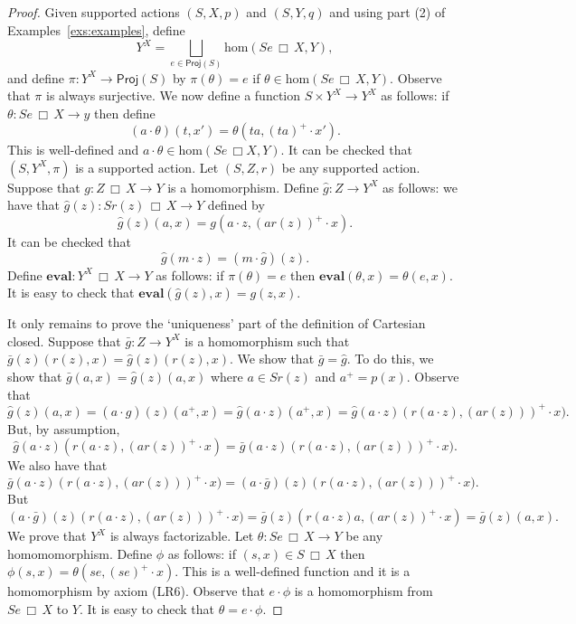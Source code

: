 \documentclass[a4paper]{amsart}
\begin{document}
\begin{proof}
Given supported actions $(S,X,p)$ and $(S,Y,q)$ and using part (2) of Examples~\ref{exs:examples},
define
$$Y^{X} = \bigsqcup_{e \in \mathsf{Proj}(S)} \mbox{hom}(Se \, \Box \, X, Y),$$ 
and define $\pi \colon Y^{X} \rightarrow \mathsf{Proj}(S)$ by $\pi (\theta) = e$ if $\theta \in \mbox{hom}(Se \, \Box \, X,Y)$.
Observe that $\pi$ is always surjective.
We now define a function $S \times Y^{X} \rightarrow Y^{X}$ as follows: 
if $\theta \colon Se\, \Box \,X \rightarrow y$ then define
$$(a \cdot \theta)(t,x') = \theta (ta, (ta)^{+} \cdot x').$$
This is well-defined and $a \cdot \theta \in \mbox{hom}(Se\, \Box X,Y)$.
It can be checked that $(S,Y^{X},\pi)$ is a supported action.
Let $(S,Z,r)$  be any supported action.
Suppose that $g \colon Z\, \Box \, X \rightarrow Y$ is a homomorphism.
Define $\hat{g} \colon Z \rightarrow Y^{X}$ as follows:
we have that $\hat{g}(z) \colon Sr(z) \, \Box \, X \rightarrow Y$ defined by
$$\hat{g}(z)(a,x) = g(a \cdot z, (ar(z))^{+} \cdot x).$$
It can be checked that
$$\hat{g}(m \cdot z) = (m \cdot \hat{g})(z).$$
Define $\mathbf{eval} \colon Y^{X} \, \Box \, X \rightarrow Y$ as follows:
if $\pi (\theta) = e$ 
then $\mathbf{eval}(\theta, x) = \theta (e,x)$.
It is easy to check that $\mathbf{eval}(\hat{g}(z),x) = g(z,x)$.

It only remains to prove the `uniqueness' part of the definition of Cartesian closed.
Suppose that $\bar{g} \colon Z \rightarrow Y^{X}$ is a homomorphism
such that $\bar{g}(z)(r(z),x) = \hat{g}(z)(r(z), x)$.
We show that $\bar{g} = \hat{g}$.
To do this, we show that $\bar{g}(a,x) = \hat{g}(z)(a,x)$
where $a \in Sr(z)$ and $a^{+} = p(x)$.
Observe that 
$$\hat{g}(z)(a,x) = (a \cdot \hat{g})(z)(a^{+},  x) = \hat{g}(a \cdot z)(a^{+}, x) = \hat{g}(a \cdot z)(r(a \cdot z), (ar(z)))^{+} \cdot x).$$
But, by assumption, 
$$\hat{g}(a \cdot z)(r(a \cdot z), (ar(z))^{+} \cdot x) = \bar{g}(a \cdot z)(r(a \cdot z), (ar(z)))^{+} \cdot x).$$
We also have that 
$$\bar{g}(a \cdot z)(r(a \cdot z), (ar(z)))^{+} \cdot x) = (a \cdot \bar{g})(z)(r(a \cdot z), (ar(z)))^{+} \cdot x).$$ 
But
$$(a \cdot \bar{g})(z)(r(a \cdot z), (ar(z)))^{+} \cdot x)
= 
\bar{g}(z)(r(a \cdot z)a, (ar(z))^{+} \cdot x) = \bar{g}(z)(a,x).$$
We prove that $Y^{X}$ is always factorizable.
Let $\theta \colon Se\, \Box \, X \rightarrow Y$ be any homomomorphism.
Define $\phi$ as follows:
if $(s,x) \in S \, \Box \, X$ then $\phi (s,x) = \theta (se, (se)^{+} \cdot x)$.
This is a well-defined function and it is a homomorphism by axiom (LR6).
Observe that $e \cdot \phi$ is a homomorphism from $Se \, \Box \, X$ to $Y$.
It is easy to check that $\theta = e \cdot \phi$.
\end{proof}
\end{document}
